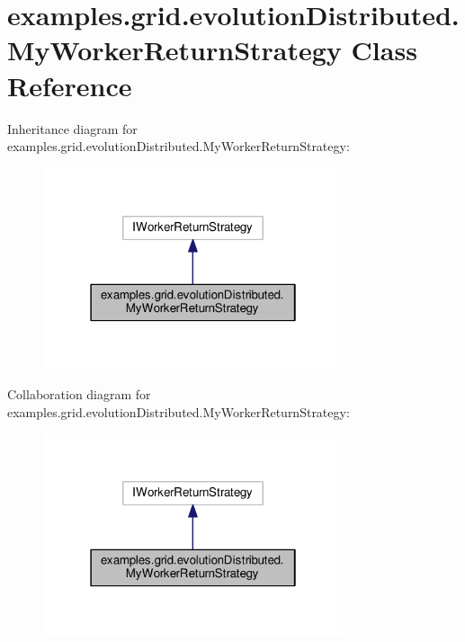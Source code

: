 \hypertarget{classexamples_1_1grid_1_1evolution_distributed_1_1_my_worker_return_strategy}{\section{examples.\-grid.\-evolution\-Distributed.\-My\-Worker\-Return\-Strategy Class Reference}
\label{classexamples_1_1grid_1_1evolution_distributed_1_1_my_worker_return_strategy}
}


Inheritance diagram for examples.\-grid.\-evolution\-Distributed.\-My\-Worker\-Return\-Strategy\-:
\nopagebreak
\begin{figure}[H]
\begin{center}
\leavevmode
\includegraphics[width=250pt]{classexamples_1_1grid_1_1evolution_distributed_1_1_my_worker_return_strategy__inherit__graph}
\end{center}
\end{figure}


Collaboration diagram for examples.\-grid.\-evolution\-Distributed.\-My\-Worker\-Return\-Strategy\-:
\nopagebreak
\begin{figure}[H]
\begin{center}
\leavevmode
\includegraphics[width=250pt]{classexamples_1_1grid_1_1evolution_distributed_1_1_my_worker_return_strategy__coll__graph}
\end{center}
\end{figure}
